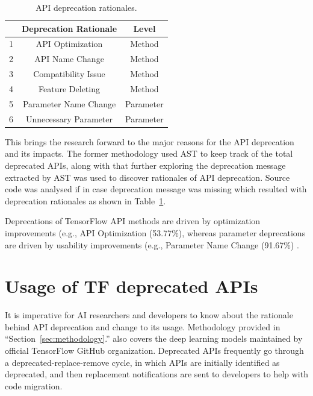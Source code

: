 \documentclass[12pt,letterpaper]{report}
\begin{document}
\begin{table}[h]
    \begin{center}
    \begin{tabular}{|l|c|c|}
    \hline
          & Deprecation Rationale & Level \\
    \hline\hline

    1 & API Optimization & Method \\
    2 & API Name Change & Method \\
    3 & Compatibility Issue & Method \\
    4 & Feature Deleting  & Method \\
    5 & Parameter Name Change & Parameter \\
    6 & Unnecessary Parameter & Parameter \\
    \hline
    \end{tabular}
    \end{center}
    \caption{API deprecation rationales.\label{api_deprecation}}
 \end{table}

This brings the research forward to the major reasons for the API deprecation and its impacts.
The former methodology used AST to keep track of the total deprecated APIs, along with that further exploring the deprecation message extracted by AST was used to discover rationales of API deprecation. Source code was analysed if in case deprecation message was missing which resulted with deprecation rationales as shown in Table~\ref{api_deprecation}.

Deprecations of TensorFlow API methods are driven by optimization improvements (e.g., API Optimization (53.77\%), whereas parameter deprecations are driven by usability improvements (e.g., Parameter Name Change (91.67\%) \cite{charsDeep}.

\section{Usage of TF deprecated APIs} \label{sec:tfdepapi}
It is imperative for AI researchers and developers to know about the rationale behind API deprecation and change to its usage.  Methodology provided in ``Section~\ref{sec:methodology}.'' also covers the deep learning models maintained by official TensorFlow GitHub organization.
Deprecated APIs frequently go through a deprecated-replace-remove cycle, in which APIs are initially identified as deprecated, and then replacement notifications are sent to developers to help with code migration.
\end{document}
